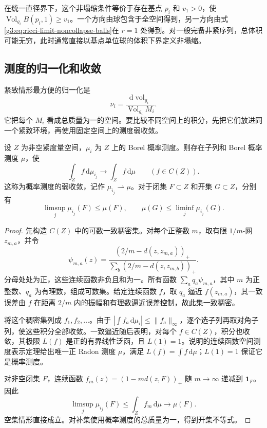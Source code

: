 在统一直径界下，这个非塌缩条件等价于存在基点 \(p_i\) 和 \(v_1>0\)，使 \(\operatorname{Vol}_{g_i}B(p_i,1)\ge v_1\)。一个方向由球包含于全空间得到，另一方向由式\eqref{g3:eq:ricci-limit-noncollapse-balls}在 \(r=1\) 处得到。对一般完备非紧序列，总体积可能无穷，此时通常直接以基点单位球的体积下界定义非塌缩。

\subsection{测度的归一化和收敛}
\label{g3:subsec:2903:02}
紧致情形最方便的归一化是
\begin{equation}\label{g3:eq:ricci-probability-normalization}
	\nu_i=\frac{\mathrm d\operatorname{vol}_{g_i}}
	{\operatorname{Vol}_{g_i}M_i}.
\end{equation}
它把每个 \(M_i\) 看成总质量为一的空间。要比较不同空间上的积分，先把它们放进同一个紧致环境，再使用固定空间上的测度弱收敛。

\begin{lemma}\label{g3:lem:compact-probability-subsequence}
	设 \(Z\) 为非空紧度量空间，\(\mu_i\) 为 \(Z\) 上的 Borel 概率测度。则存在子列和 Borel 概率测度 \(\mu\)，使
	\begin{equation}\label{g3:eq:compact-measure-weak-convergence}
		\int_Z f\,\mathrm d\mu_{i_j}\longrightarrow
		\int_Z f\,\mathrm d\mu\qquad(f\in C(Z)).
	\end{equation}
	这称为概率测度的弱收敛，记作 \(\mu_{i_j}\rightharpoonup\mu\)。对于闭集 \(F\subset Z\) 和开集 \(G\subset Z\)，分别有
	\begin{equation}\label{g3:eq:weak-measure-closed-open}
		\limsup_j\mu_{i_j}(F)\le\mu(F),
		\qquad \mu(G)\le\liminf_j\mu_{i_j}(G).
	\end{equation}
\end{lemma}
\begin{proof}
	先构造 \(C(Z)\) 中的可数一致稠密集。对每个正整数 \(m\)，取有限 \(1/m\)-网 \(z_{m,a}\)，并令
	\[
		\psi_{m,a}(z)=
		\frac{(2/m-d(z,z_{m,a}))_+}
		{\sum_b(2/m-d(z,z_{m,b}))_+}.
	\]
	分母处处为正，这些连续函数非负且和为一。所有函数 \(\sum_aq_a\psi_{m,a}\)，其中 \(m\) 为正整数、\(q_a\) 为有理数，组成可数集。给定连续函数 \(f\)，取 \(q_a\) 逼近 \(f(z_{m,a})\)，其一致误差由 \(f\) 在距离 \(2/m\) 内的振幅和有理数逼近误差控制，故此集一致稠密。

	将这个稠密集列成 \(f_1,f_2,\ldots\)。由于 \(|\int f_a\,\mathrm d\mu_i|\le\|f_a\|_\infty\)，逐个选子列再取对角子列，使这些积分全部收敛。一致逼近随后表明，对每个 \(f\in C(Z)\)，积分也收敛，其极限 \(L(f)\) 是正的有界线性泛函，且 \(L(1)=1\)。说明的连续函数空间测度表示定理给出唯一正 Radon 测度 \(\mu\)，满足 \(L(f)=\int f\,\mathrm d\mu\)；\(L(1)=1\) 保证它是概率测度。

	对非空闭集 \(F\)，连续函数
	\(f_m(z)=(1-md(z,F))_+\) 随 \(m\to\infty\) 递减到 \(\mathbf1_F\)。因此
	\[
		\limsup_j\mu_{i_j}(F)
		\le\int_Zf_m\,\mathrm d\mu
		\longrightarrow\mu(F).
	\]
	空集情形直接成立。对补集使用概率测度的总质量为一，得到开集不等式。
\end{proof}

